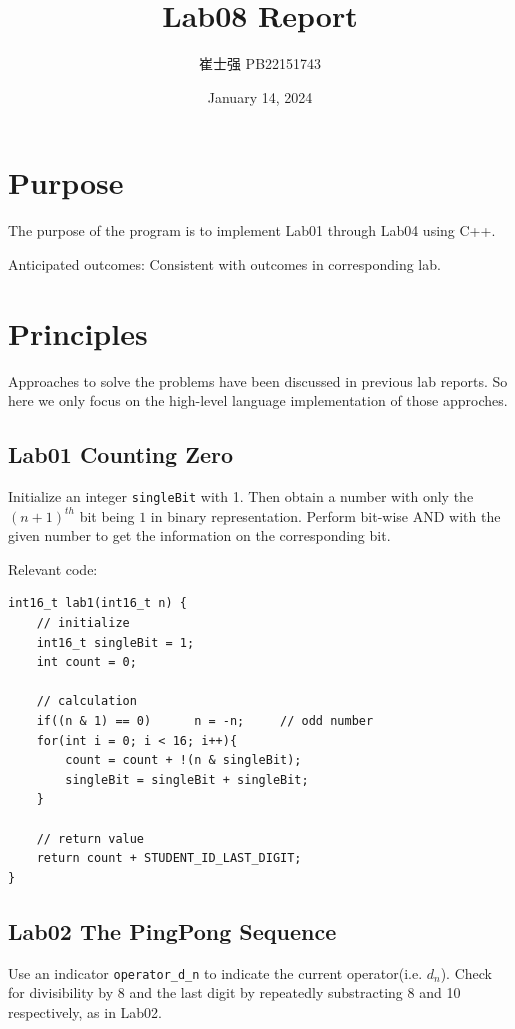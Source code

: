 \documentclass[UTF8]{ctexart}
\title{Lab08 Report}
\author{崔士强 PB22151743}
\date{January 14, 2024}
\begin{document}
\maketitle
\section{Purpose}
The purpose of the program is to implement Lab01 through Lab04 using C++.

Anticipated outcomes: Consistent with outcomes in corresponding lab.

\section{Principles}
Approaches to solve the problems have been discussed in previous lab reports. So here we only focus on the  
high-level language implementation of those approches.

\subsection{Lab01 Counting Zero}
Initialize an integer \lstinline{singleBit} with 1. Then obtain 
a number with only the $(n+1)^{th}$ bit being $1$ in binary representation. Perform bit-wise AND with the
given number to get the information on the corresponding bit.

Relevant code:
\begin{lstlisting}[caption = {Lab01}]
int16_t lab1(int16_t n) {
    // initialize
    int16_t singleBit = 1;
    int count = 0;

    // calculation
    if((n & 1) == 0)      n = -n;     // odd number
    for(int i = 0; i < 16; i++){
        count = count + !(n & singleBit);
        singleBit = singleBit + singleBit;
    }

    // return value
    return count + STUDENT_ID_LAST_DIGIT;
}
\end{lstlisting}

\subsection{Lab02 The PingPong Sequence}
Use an indicator \lstinline{operator_d_n} to indicate the current operator(i.e. $d_n$). Check
for divisibility by $8$ and the last digit by repeatedly substracting 8 and 10 respectively, as in Lab02.
\end{document}
